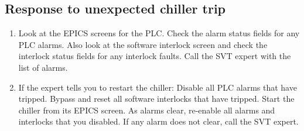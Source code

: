 \subsection{Response to unexpected chiller trip}
\label{sec:proc_cooling_chillertrip}

\begin{enumerate}
    \item Look at the EPICS screens for the PLC. Check the alarm status fields for any PLC alarms. Also look at the software interlock screen and check the interlock status fields for any interlock faults. Call the SVT expert with the list of alarms.
    \item If the expert tells you to restart the chiller: Disable all PLC alarms that have tripped. Bypass and reset all software interlocks that have tripped. Start the chiller from its EPICS screen. As alarms clear, re-enable all alarms and interlocks that you disabled. If any alarm does not clear, call the SVT expert.
\end{enumerate}

